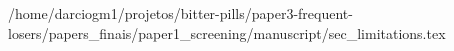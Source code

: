 /home/darciogm1/projetos/bitter-pills/paper3-frequent-losers/papers_finais/paper1_screening/manuscript/sec_limitations.tex